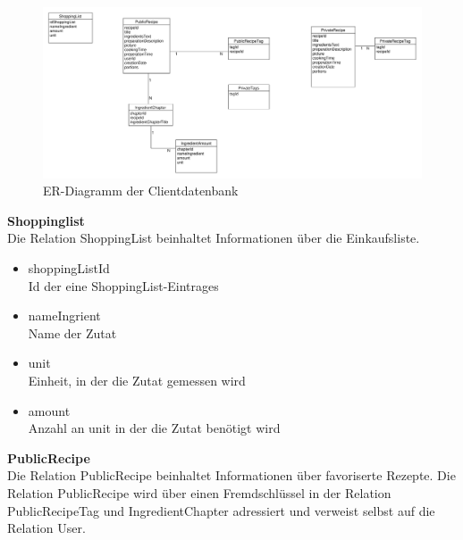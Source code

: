 \begin{figure}
	\centering
	\includegraphics[width=1.0\textwidth]{pics/ClientDB.pdf}%
	\caption{ER-Diagramm der Clientdatenbank}%
\end{figure}

\textbf{Shoppinglist}\\
Die Relation ShoppingList beinhaltet Informationen über die Einkaufsliste.

\begin{itemize}
	\item shoppingListId \\ Id der eine ShoppingList-Eintrages
	\item nameIngrient \\ Name der Zutat
	\item unit \\ Einheit, in der die Zutat gemessen wird
	\item amount \\ Anzahl an unit in der die Zutat benötigt wird
\end{itemize}

\textbf{PublicRecipe}\\
Die Relation PublicRecipe beinhaltet Informationen über favoriserte Rezepte. Die Relation PublicRecipe wird über einen Fremdschlüssel in der Relation PublicRecipeTag und IngredientChapter adressiert und verweist selbst auf die Relation User.

